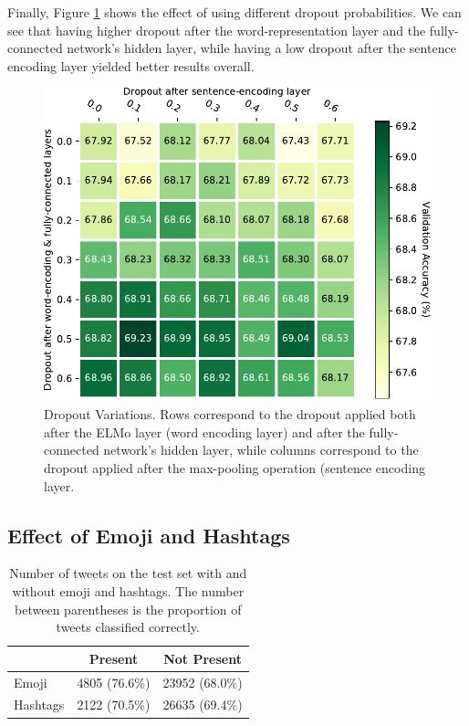 \documentclass[11pt,a4paper]{article}
\begin{document}
Finally, Figure \ref{fig:dropouts} shows the effect of using different dropout probabilities. We can see that having higher dropout after the word-representation layer and the fully-connected network's hidden layer, while having a low dropout after the sentence encoding layer yielded better results overall. 

\begin{figure}[!h]
    \centering
    \includegraphics[width=\columnwidth]{images/dropout_table.pdf}
\caption{Dropout Variations. Rows correspond to the dropout applied both after the ELMo layer (word encoding layer) and after the fully-connected network's hidden layer, while columns correspond to the dropout applied after the max-pooling operation (sentence encoding layer.}
\label{fig:dropouts}
\end{figure}

\subsection{Effect of Emoji and Hashtags}%
\label{sub:effect_of_emoji_and_hashtags}

\begin{table}[!h]
    \centering
    \footnotesize

    \begin{tabular}{lcc}

        \textbf{} & \textbf{Present} & \textbf{Not Present} \\
        \hline
        \hline
        Emoji     & 4805 (76.6\%)    & 23952 (68.0\%)       \\
        Hashtags  & 2122 (70.5\%)    & 26635 (69.4\%)       \\

    \end{tabular}

    \caption{Number of tweets on the test set with and without emoji and
    hashtags. The number between parentheses is the proportion of tweets
    classified correctly.}

    \label{table:emoji_and_hashtags}

\end{table}
\end{document}
